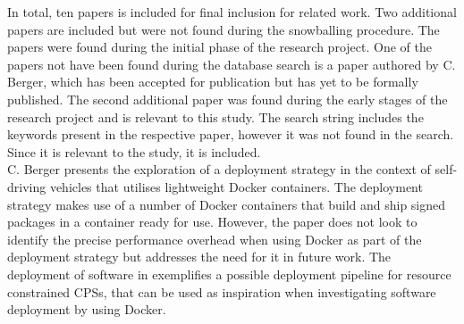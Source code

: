 In total, ten papers is included for final inclusion for related work. Two additional papers are included but were not found during the snowballing procedure. The papers were found during the initial phase of the research project. One of the papers not have been found during the database search is a paper authored by C. Berger, which has been accepted for publication but has yet to be formally published. The second additional paper was found during the early stages of the research project and is relevant to this study. The search string includes the keywords present in the respective paper, however it was not found in the search. Since it is relevant to the study, it is included. \\


C. Berger \cite{cberger} presents the exploration of a deployment strategy in the context of self-driving vehicles that utilises lightweight Docker containers. The deployment strategy makes use of a number of Docker containers that build and ship signed packages in a container ready for use. However, the paper does not look to identify the precise performance overhead when using Docker as part of the deployment strategy but addresses the need for it in future work. The deployment of software in \cite{cberger} exemplifies a possible deployment pipeline for resource constrained CPSs, that can be used as inspiration when investigating software deployment by using Docker.\\

